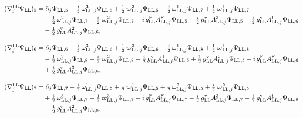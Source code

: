 \documentclass[
  10pt,
]{article}
\begin{document}
\[\begin{aligned}
(\nabla^{\rm LL}_j\Psi_{\rm LL})_5&=\partial_j\Psi_{{\rm LL},5}-\tfrac{i}{2}\,\omega^{3}_{{\rm LL},j}\Psi_{{\rm LL},5}+\tfrac{1}{2}\,\varpi^{3}_{{\rm LL},j}\Psi_{{\rm LL},5}-\tfrac{i}{2}\,\omega^{1}_{{\rm LL},j}\Psi_{{\rm LL},7}+\tfrac{1}{2}\,\varpi^{1}_{{\rm LL},j}\Psi_{{\rm LL},7}\\
&\quad -\tfrac{1}{2}\,\omega^{2}_{{\rm LL},j}\Psi_{{\rm LL},7}-\tfrac{i}{2}\,\varpi^{2}_{{\rm LL},j}\Psi_{{\rm LL},7}-i\,g^{\rm F}_{\rm LL}A^{\rm F}_{{\rm LL},j}\Psi_{{\rm LL},5}-\tfrac{i}{2}\,g^{\rm v}_{\rm LL}A^{3}_{{\rm LL},j}\Psi_{{\rm LL},5}-\tfrac{i}{2}\,g^{\rm v}_{\rm LL}A^{1}_{{\rm LL},j}\Psi_{{\rm LL},6}\\
&\quad -\tfrac{1}{2}\,g^{\rm v}_{\rm LL}A^{2}_{{\rm LL},j}\Psi_{{\rm LL},6},
\end{aligned}\]

\[\begin{aligned}
(\nabla^{\rm LL}_j\Psi_{\rm LL})_6&=\partial_j\Psi_{{\rm LL},6}-\tfrac{i}{2}\,\omega^{3}_{{\rm LL},j}\Psi_{{\rm LL},6}+\tfrac{1}{2}\,\varpi^{3}_{{\rm LL},j}\Psi_{{\rm LL},6}-\tfrac{i}{2}\,\omega^{1}_{{\rm LL},j}\Psi_{{\rm LL},8}+\tfrac{1}{2}\,\varpi^{1}_{{\rm LL},j}\Psi_{{\rm LL},8}\\
&\quad -\tfrac{1}{2}\,\omega^{2}_{{\rm LL},j}\Psi_{{\rm LL},8}-\tfrac{i}{2}\,\varpi^{2}_{{\rm LL},j}\Psi_{{\rm LL},8}-\tfrac{i}{2}\,g^{\rm v}_{\rm LL}A^{1}_{{\rm LL},j}\Psi_{{\rm LL},5}+\tfrac{1}{2}\,g^{\rm v}_{\rm LL}A^{2}_{{\rm LL},j}\Psi_{{\rm LL},5}-i\,g^{\rm F}_{\rm LL}A^{\rm F}_{{\rm LL},j}\Psi_{{\rm LL},6}\\
&\quad +\tfrac{i}{2}\,g^{\rm v}_{\rm LL}A^{3}_{{\rm LL},j}\Psi_{{\rm LL},6},
\end{aligned}\]

\[\begin{aligned}
(\nabla^{\rm LL}_j\Psi_{\rm LL})_7&=\partial_j\Psi_{{\rm LL},7}-\tfrac{i}{2}\,\omega^{1}_{{\rm LL},j}\Psi_{{\rm LL},5}+\tfrac{1}{2}\,\varpi^{1}_{{\rm LL},j}\Psi_{{\rm LL},5}+\tfrac{1}{2}\,\omega^{2}_{{\rm LL},j}\Psi_{{\rm LL},5}+\tfrac{i}{2}\,\varpi^{2}_{{\rm LL},j}\Psi_{{\rm LL},5}\\
&\quad +\tfrac{i}{2}\,\omega^{3}_{{\rm LL},j}\Psi_{{\rm LL},7}-\tfrac{1}{2}\,\varpi^{3}_{{\rm LL},j}\Psi_{{\rm LL},7}-i\,g^{\rm F}_{\rm LL}A^{\rm F}_{{\rm LL},j}\Psi_{{\rm LL},7}-\tfrac{i}{2}\,g^{\rm v}_{\rm LL}A^{3}_{{\rm LL},j}\Psi_{{\rm LL},7}-\tfrac{i}{2}\,g^{\rm v}_{\rm LL}A^{1}_{{\rm LL},j}\Psi_{{\rm LL},8}\\
&\quad -\tfrac{1}{2}\,g^{\rm v}_{\rm LL}A^{2}_{{\rm LL},j}\Psi_{{\rm LL},8},
\end{aligned}\]
\end{document}
